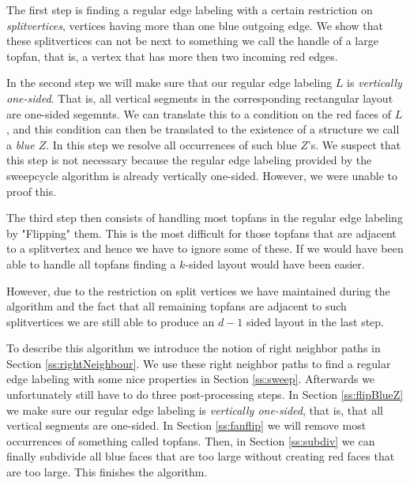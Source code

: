   The first step is finding a regular edge labeling with a certain restriction on \emph{splitvertices}, vertices having more than one blue outgoing edge.
  We show that these splitvertices can not be next to something we call the handle of a large topfan, that is, a vertex that has more then two incoming red edges.

  In the second step we will make sure that our regular edge labeling $L$ is \emph{vertically one-sided}. That is, all vertical segments in the corresponding rectangular layout are one-sided segemnts.
  We can translate this to a condition on the red faces of $L$, and this condition can then be translated to the existence of a structure we call a \emph{blue $Z$}. In this step we resolve all occurrences of such blue $Z$'s.
  We suspect that this step is not necessary because the regular edge labeling provided by the sweepcycle algorithm is already vertically one-sided. However, we were unable to proof this.

  The third step then consists of handling most topfans in the regular edge labeling by "Flipping" them. This is the most difficult for those topfans that are adjacent to a splitvertex and hence we have to ignore some of these. If we would have been able to handle all topfans finding a $k$-sided layout would have been easier.

  However, due to the restriction on split vertices we have maintained during the algorithm and the fact that all remaining topfans are adjacent to such splitvertices we are still able to produce an $d-1$ sided layout in the last step.

  To describe this algorithm we introduce the notion of right neighbor paths in Section \ref{ss:rightNeighbour}.  We use these right neighbor paths to find a regular edge labeling with some nice properties in Section \ref{ss:sweep}. Afterwards we unfortunately still have to do three post-processing steps. In Section \ref{ss:flipBlueZ} we make sure our regular edge labeling is \emph{vertically one-sided}, that is, that all vertical segments are one-sided. In Section \ref{ss:fanflip} we will remove most occurrences of something called topfans. Then, in Section \ref{ss:subdiv} we can finally subdivide all blue faces that are too large without creating red faces that are too large. This finishes the algorithm.
